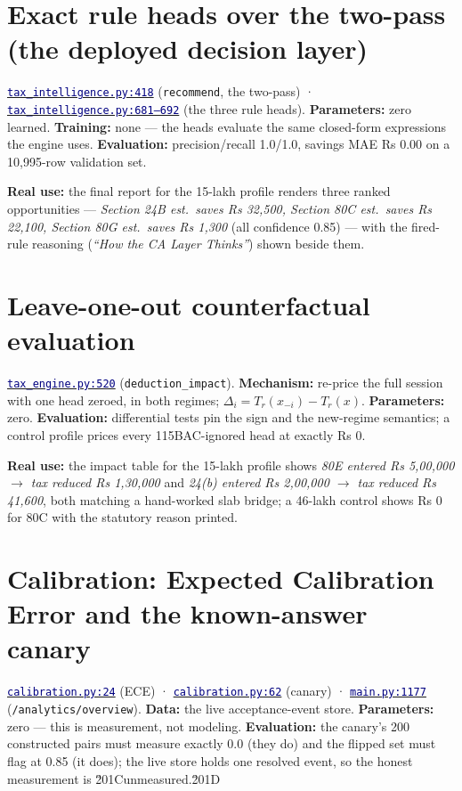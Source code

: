 \documentclass[11pt,a4paper]{article}
\newcommand{\code}[2]{\href{https://github.com/Jayant1711/Tax_Assist-system/blob/v0.7-sprint7/#1}{\texttt{\textcolor{navy}{#2}}}}
\newcommand{\facts}[1]{{\small\textcolor{muted}{#1}\par}}
\begin{document}
\section{Exact rule heads over the two-pass (the deployed decision layer)}
\facts{\code{backend/tax\_intelligence.py}{tax\_intelligence.py:418}
(\texttt{recommend}, the two-pass) ·
\code{backend/tax\_intelligence.py}{tax\_intelligence.py:681--692} (the three
rule heads). \textbf{Parameters:} zero learned. \textbf{Training:} none ---
the heads evaluate the same closed-form expressions the engine uses.
\textbf{Evaluation:} precision/recall 1.0/1.0, savings MAE Rs 0.00 on a
10,995-row validation set.}

\begin{examplebox}
\textbf{Real use:} the final report for the 15-lakh profile renders three ranked
opportunities --- \emph{Section 24B est.\ saves Rs 32,500, Section 80C est.\ saves
Rs 22,100, Section 80G est.\ saves Rs 1,300} (all confidence 0.85) --- with the
fired-rule reasoning (\emph{``How the CA Layer Thinks''}) shown beside them.
\end{examplebox}

\section{Leave-one-out counterfactual evaluation}
\facts{\code{backend/tax\_engine.py}{tax\_engine.py:520}
(\texttt{deduction\_impact}). \textbf{Mechanism:} re-price the full session with
one head zeroed, in both regimes;
$\Delta_i = T_r(x_{-i}) - T_r(x)$. \textbf{Parameters:} zero. \textbf{Evaluation:}
differential tests pin the sign and the new-regime semantics; a control profile
prices every 115BAC-ignored head at exactly Rs 0.}

\begin{examplebox}
\textbf{Real use:} the impact table for the 15-lakh profile shows
\emph{80E entered Rs 5,00,000 $\rightarrow$ tax reduced Rs 1,30,000} and
\emph{24(b) entered Rs 2,00,000 $\rightarrow$ tax reduced Rs 41,600}, both
matching a hand-worked slab bridge; a 46-lakh control shows Rs 0 for 80C with
the statutory reason printed.
\end{examplebox}

\section{Calibration: Expected Calibration Error and the known-answer canary}
\facts{\code{backend/calibration.py}{calibration.py:24} (ECE) ·
\code{backend/calibration.py}{calibration.py:62} (canary) ·
\code{backend/main.py}{main.py:1177} (\texttt{/analytics/overview}).
\textbf{Data:} the live acceptance-event store. \textbf{Parameters:} zero ---
this is measurement, not modeling. \textbf{Evaluation:} the canary's 200
constructed pairs must measure exactly 0.0 (they do) and the flipped set must
flag at 0.85 (it does); the live store holds one resolved event, so the honest
measurement is \u201Cunmeasured.\u201D}
\end{document}
